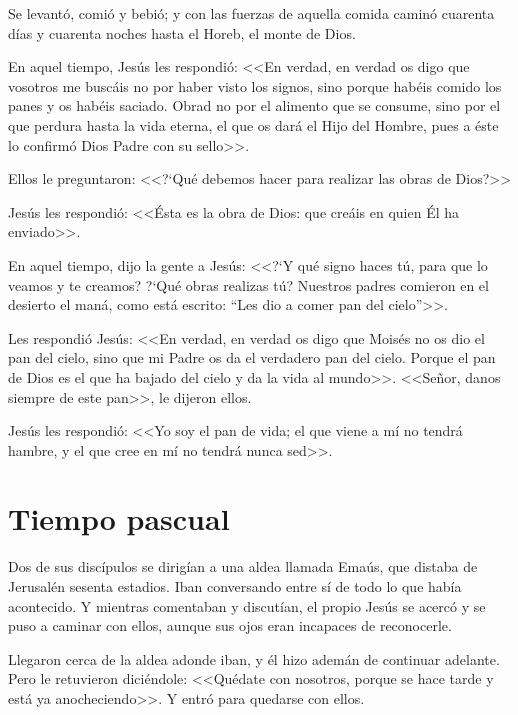 Se 
levantó, comió y bebió; y con las fuerzas de 
aquella comida caminó cuarenta días y 
cuarenta noches hasta el Horeb, el monte de 
Dios.


 En aquel tiempo, Jesús les respondió: <<En 
verdad, en verdad os digo que vosotros me 
buscáis no por haber visto los signos, sino 
porque habéis comido los panes y os habéis 
saciado. Obrad no por el alimento que se 
consume, sino por el que perdura hasta la vida 
eterna, el que os dará el Hijo del Hombre, pues 
a éste lo confirmó Dios Padre con su sello>>. 


Ellos le preguntaron: <<?`Qué debemos hacer 
para realizar las obras de Dios?>> 


Jesús les 
respondió: <<Ésta es la obra de Dios: que creáis 
en quien Él ha enviado>>. 


 En aquel tiempo, dijo la gente a Jesús: <<?`Y qué 
signo haces tú, para que lo veamos y te 
creamos? ?`Qué obras realizas tú? Nuestros 
padres comieron en el desierto el maná, como 
está escrito: ``Les dio a comer pan del cielo''>>.

Les respondió Jesús: <<En verdad, en verdad os 
digo que Moisés no os dio el pan del cielo, sino 
que mi Padre os da el verdadero pan del cielo. 
Porque el pan de Dios es el que ha bajado del 
cielo y da la vida al mundo>>. <<Señor, danos 
siempre de este pan>>, le dijeron ellos. 

Jesús les 
respondió: <<Yo soy el pan de vida; el que viene 
a mí no tendrá hambre, y el que cree en mí no 
tendrá nunca sed>>. 

\newpage
\section{Tiempo pascual}


 Dos de sus discípulos se dirigían a una aldea 
llamada Emaús, que distaba de Jerusalén 
sesenta estadios. Iban conversando entre sí de 
todo lo que había acontecido. Y mientras 
comentaban y discutían, el propio Jesús se 
acercó y se puso a caminar con ellos, aunque 
sus ojos eran incapaces de reconocerle. 

Llegaron cerca de la aldea adonde iban, y él 
hizo ademán de continuar adelante. Pero le 
retuvieron diciéndole: <<Quédate con nosotros, 
porque se hace tarde y está ya anocheciendo>>. 
Y entró para quedarse con ellos. 

